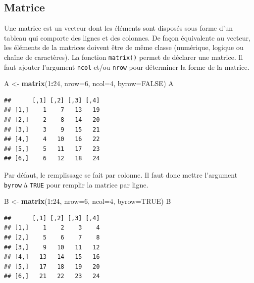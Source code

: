 \documentclass[
]{book}
\newenvironment{Shaded}{\begin{snugshade}}{\end{snugshade}}
\newcommand{\AttributeTok}[1]{\textcolor[rgb]{0.13,0.29,0.53}{#1}}
\newcommand{\ConstantTok}[1]{\textcolor[rgb]{0.56,0.35,0.01}{#1}}
\newcommand{\DecValTok}[1]{\textcolor[rgb]{0.00,0.00,0.81}{#1}}
\newcommand{\FunctionTok}[1]{\textcolor[rgb]{0.13,0.29,0.53}{\textbf{#1}}}
\newcommand{\NormalTok}[1]{#1}
\newcommand{\OtherTok}[1]{\textcolor[rgb]{0.56,0.35,0.01}{#1}}
\newcommand{\SpecialCharTok}[1]{\textcolor[rgb]{0.81,0.36,0.00}{\textbf{#1}}}
\begin{document}
\subsection{Matrice}\label{matrice}

Une matrice est un vecteur dont les éléments sont disposés sous forme d'un tableau qui comporte des lignes et des colonnes. De façon équivalente au vecteur, les éléments de la matrices doivent être de même classe (numérique, logique ou chaîne de caractères). La fonction \texttt{matrix()} permet de déclarer une matrice. Il faut ajouter l'argument \texttt{ncol} et/ou \texttt{nrow} pour déterminer la forme de la matrice.

\begin{Shaded}
\begin{Highlighting}[]
\NormalTok{A }\OtherTok{\textless{}{-}} \FunctionTok{matrix}\NormalTok{(}\DecValTok{1}\SpecialCharTok{:}\DecValTok{24}\NormalTok{, }\AttributeTok{nrow=}\DecValTok{6}\NormalTok{, }\AttributeTok{ncol=}\DecValTok{4}\NormalTok{, }\AttributeTok{byrow=}\ConstantTok{FALSE}\NormalTok{)}
\NormalTok{A}
\end{Highlighting}
\end{Shaded}

\begin{verbatim}
##      [,1] [,2] [,3] [,4]
## [1,]    1    7   13   19
## [2,]    2    8   14   20
## [3,]    3    9   15   21
## [4,]    4   10   16   22
## [5,]    5   11   17   23
## [6,]    6   12   18   24
\end{verbatim}

Par défaut, le remplissage se fait par colonne. Il faut donc mettre l'argument \texttt{byrow} à \texttt{TRUE} pour remplir la matrice par ligne.

\begin{Shaded}
\begin{Highlighting}[]
\NormalTok{B }\OtherTok{\textless{}{-}} \FunctionTok{matrix}\NormalTok{(}\DecValTok{1}\SpecialCharTok{:}\DecValTok{24}\NormalTok{, }\AttributeTok{nrow=}\DecValTok{6}\NormalTok{, }\AttributeTok{ncol=}\DecValTok{4}\NormalTok{, }\AttributeTok{byrow=}\ConstantTok{TRUE}\NormalTok{)}
\NormalTok{B}
\end{Highlighting}
\end{Shaded}

\begin{verbatim}
##      [,1] [,2] [,3] [,4]
## [1,]    1    2    3    4
## [2,]    5    6    7    8
## [3,]    9   10   11   12
## [4,]   13   14   15   16
## [5,]   17   18   19   20
## [6,]   21   22   23   24
\end{verbatim}
\end{document}
